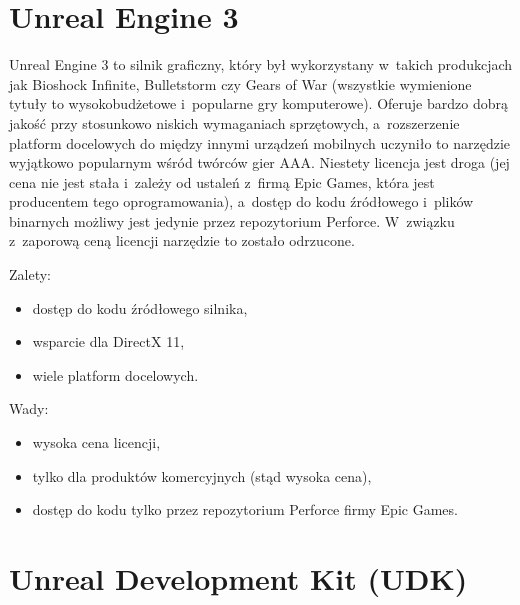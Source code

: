\section{Unreal Engine 3}

Unreal Engine 3 to silnik graficzny, który był wykorzystany w~takich produkcjach jak Bioshock Infinite, Bulletstorm czy Gears of War (wszystkie wymienione tytuły to wysokobudżetowe i~popularne gry komputerowe). Oferuje bardzo dobrą jakość przy stosunkowo niskich wymaganiach sprzętowych, a~rozszerzenie platform docelowych do między innymi urządzeń mobilnych uczyniło to narzędzie wyjątkowo popularnym wśród twórców gier AAA. Niestety licencja jest droga (jej cena nie jest stała i~zależy od ustaleń z~firmą Epic Games, która jest producentem tego oprogramowania), a~dostęp do kodu źródłowego i~plików binarnych możliwy jest jedynie przez repozytorium Perforce. W~związku z~zaporową ceną licencji narzędzie to zostało odrzucone.\\

{\raggedright Zalety:
\begin{itemize}
\item dostęp do kodu źródłowego silnika,
\item wsparcie dla DirectX 11,
\item wiele platform docelowych.
\end{itemize}

Wady:
\begin{itemize}
\item wysoka cena licencji,
\item tylko dla produktów komercyjnych (stąd wysoka cena),
\item dostęp do kodu tylko przez repozytorium Perforce firmy Epic Games.
\end{itemize}
}

\section{Unreal Development Kit (UDK)}


